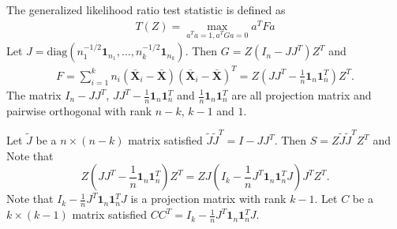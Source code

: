 \documentclass[review]{elsarticle}
\theoremstyle{plain}
\theoremstyle{definition}
\theoremstyle{remark}
\begin{document}
The generalized likelihood ratio test statistic is defined as
\begin{equation}
    \begin{aligned}
        T(Z)
        =
        \max_{a^T a=1, a^T G a=0} 
        a^T F a
    \end{aligned}
\end{equation}
Let $J=\mathrm{diag}(n_1^{-1/2}\mathbf{1}_{n_1},\ldots,n_k^{-1/2}\mathbf{1}_{n_k})$.
Then $G=Z(I_n-JJ^T)Z^T$ and
\begin{equation}
    \begin{aligned}
        F=\sum_{i=1}^k n_i (\bar{\mathbf{X}}_i-\bar{\mathbf{X}})(\bar{\mathbf{X}}_i-\bar{\mathbf{X}})^T 
        =Z(JJ^T-\frac{1}{n}\mathbf{1}_n\mathbf{1}_n^T)Z^T.
    \end{aligned}
\end{equation}
The matrix $I_n-JJ^T$, $JJ^T-\frac{1}{n}\mathbf{1}_n\mathbf{1}_n^T$ and $\frac{1}{n}\mathbf{1}_n\mathbf{1}_n^T$ are all projection matrix and pairwise orthogonal with rank $n-k$, $k-1$ and $1$.

Let $\tilde{J}$ be a $n\times (n-k)$ matrix satisfied $\tilde{J}\tilde{J}^T =I-JJ^T$.
Then $S=Z\tilde{J}\tilde{J}^T Z^T$ and
 Note that 
$$
Z(JJ^T-\frac{1}{n}\mathbf{1}_n\mathbf{1}_n^T)Z^T
=ZJ(I_k-\frac{1}{n}J^T\mathbf{1}_n \mathbf{1}_n^T J)J^T Z^T.
$$
Note that $I_k-\frac{1}{n}J^T\mathbf{1}_n \mathbf{1}_n^T J$ is a projection matrix with rank $k-1$.
Let $C$ be a $k\times (k-1)$ matrix satisfied $CC^T=I_k-\frac{1}{n}J^T\mathbf{1}_n \mathbf{1}_n^T J$.
\end{document}
